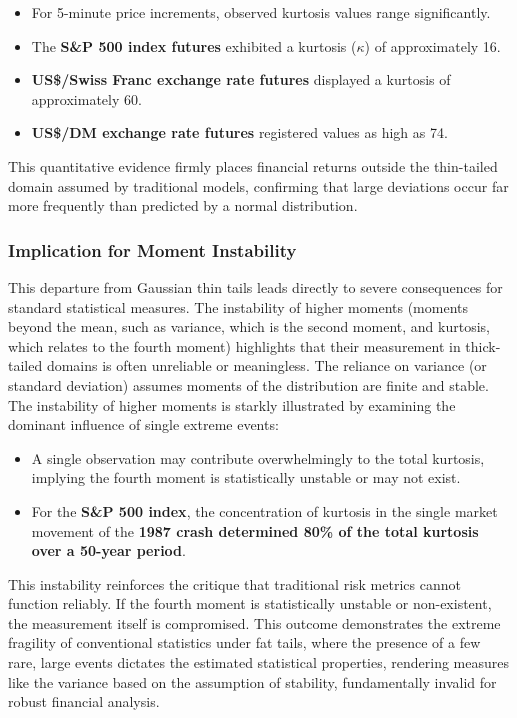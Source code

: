 \documentclass{ieeetj}
\begin{document}
\begin{itemize}
    \item For 5-minute price increments, observed kurtosis values range significantly.
    \item The \textbf{S\&P 500 index futures} exhibited a kurtosis ($\kappa$) of approximately 16.
    \item \textbf{US\$/Swiss Franc exchange rate futures} displayed a kurtosis of approximately 60.
    \item \textbf{US\$/DM exchange rate futures} registered values as high as 74.
\end{itemize}

This quantitative evidence firmly places financial returns outside the thin-tailed domain assumed by traditional models, confirming that large deviations occur far more frequently than predicted by a normal distribution.

\subsubsection{Implication for Moment Instability}

This departure from Gaussian thin tails leads directly to severe consequences for standard statistical measures. The instability of higher moments (moments beyond the mean, such as variance, which is the second moment, and kurtosis, which relates to the fourth moment) highlights that their measurement in thick-tailed domains is often unreliable or meaningless. The reliance on variance (or standard deviation) assumes moments of the distribution are finite and stable.
The instability of higher moments is starkly illustrated by examining the dominant influence of single extreme events:

\begin{itemize}
    \item A single observation may contribute overwhelmingly to the total kurtosis, implying the fourth moment is statistically unstable or may not exist.
    \item For the\textbf{ S\&P 500 index}, the concentration of kurtosis in the single market movement of the \textbf{1987 crash determined 80\% of the total kurtosis over a 50-year period}.
\end{itemize}


This instability reinforces the critique that traditional risk metrics cannot function reliably. If the fourth moment is statistically unstable or non-existent, the measurement itself is compromised. This outcome demonstrates the extreme fragility of conventional statistics under fat tails, where the presence of a few rare, large events dictates the estimated statistical properties, rendering measures like the variance based on the assumption of stability, fundamentally invalid for robust financial analysis.
\end{document}

